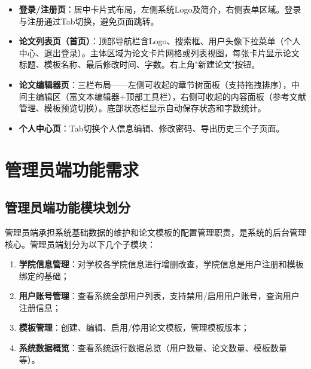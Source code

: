\documentclass{../../softeng}
\begin{document}
\begin{itemize}
    \item \textbf{登录/注册页}：居中卡片式布局，左侧系统Logo及简介，右侧表单区域。登录与注册通过Tab切换，避免页面跳转。
    \item \textbf{论文列表页（首页）}：顶部导航栏含Logo、搜索框、用户头像下拉菜单（个人中心、退出登录）。主体区域为论文卡片网格或列表视图，每张卡片显示论文标题、模板名称、最后修改时间、字数。右上角"新建论文"按钮。
    \item \textbf{论文编辑器页}：三栏布局——左侧可收起的章节树面板（支持拖拽排序），中间主编辑区（富文本编辑器+顶部工具栏），右侧可收起的内容面板（参考文献管理、模板预览切换）。底部状态栏显示自动保存状态和字数统计。
    \item \textbf{个人中心页}：Tab切换个人信息编辑、修改密码、导出历史三个子页面。
\end{itemize}

\section{管理员端功能需求}

\subsection{管理员端功能模块划分}

管理员端承担系统基础数据的维护和论文模板的配置管理职责，是系统的后台管理核心。管理员端划分为以下几个子模块：

\begin{enumerate}
    \item \textbf{学院信息管理}：对学校各学院信息进行增删改查，学院信息是用户注册和模板绑定的基础；
    \item \textbf{用户账号管理}：查看系统全部用户列表，支持禁用/启用用户账号，查询用户注册信息；
    \item \textbf{模板管理}：创建、编辑、启用/停用论文模板，管理模板版本；
    \item \textbf{系统数据概览}：查看系统运行数据总览（用户数量、论文数量、模板数量等）。
\end{enumerate}
\end{document}
